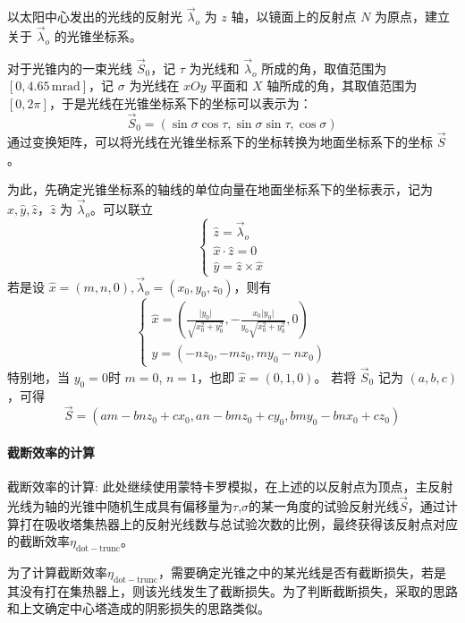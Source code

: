 \documentclass[../main.tex]{subfiles}
\begin{document}
以太阳中心发出的光线的反射光 \(\vec\lambda _{o} \) 为 \(z\) 轴，以镜面上的反射点 \(N\) 为原点，建立关于 \(\vec \lambda _{o}\) 的光锥坐标系。

对于光锥内的一束光线 \(\vec S _{0}\)，记 \(\tau\) 为光线和 \(\vec\lambda _{o}\) 所成的角，取值范围为 \([0, 4.65\, \mathrm{m}\mathrm{rad}]\)，记 \(\sigma\) 为光线在 \(xOy\) 平面和 \(X\) 轴所成的角，其取值范围为 \([0 , 2\pi]\)，于是光线在光锥坐标系下的坐标可以表示为：
\[
\vec S _{0} = (\sin \sigma \cos \tau, \sin \sigma \sin \tau, \cos \sigma)
\]
通过变换矩阵，可以将光线在光锥坐标系下的坐标转换为地面坐标系下的坐标 \(\vec S\)。

为此，先确定光锥坐标系的轴线的单位向量在地面坐标系下的坐标表示，记为 \(\hat x, \hat y, \hat z\)，\(\hat z\) 为 \(\vec \lambda _{o}\)。可以联立
\[
\begin{cases}
\hat z = \vec \lambda _{o}\\
\hat x \cdot \hat z = 0\\
\hat y = \hat z \times \hat x
\end{cases}
\]
若是设 \(\hat x = (m , n , 0), \vec \lambda _{o} = (x_0, y_0,z_0)\)，则有
\[
\begin{cases}
\displaystyle\hat x = \left(\frac{\vert y_{0} \vert}{\sqrt{x_{0}^{2}+ y _{0} ^{2}}}, {-}\frac{x_{0}\vert y_{0} \vert}{y_{0}\sqrt{x_{0}^{2}+y_{0}^{2}}}, 0\right)\\
\displaystyle \hat y = ({-} n z_{0}, - m z_{0} , my_{0} - n x_{0})
\end{cases}
\]
特别地，当 \(y_{0} = 0\)时 \(m = 0 \), \(n=1\)，也即 \(\hat x  = (0,1,0)\)。
若将 \(\vec S_{0}\) 记为 \((a,b ,c)\)，可得
\begin{equation}
\vec S = (am - b nz _{0}+ c x_{0}, an - bmz_{0} + cy_{0}, bmy_{0} - bnx _{0} + cz_{0})
\end{equation}

\paragraph{截断效率的计算}
截断效率的计算: 此处继续使用蒙特卡罗模拟，在上述的以反射点为顶点，主反射光线为轴的光锥中随机生成具有偏移量为\(\tau\),\(\sigma\)的某一角度的试验反射光线\(\vec S\)，通过计算打在吸收塔集热器上的反射光线数与总试验次数的比例，最终获得该反射点对应的截断效率\(\eta _{\mathrm{dot}{-}\mathrm{trunc}}\)。

为了计算截断效率\(\eta _{\mathrm{dot-trunc}}\)，需要确定光锥之中的某光线是否有截断损失，若是其没有打在集热器上，则该光线发生了截断损失。为了判断截断损失，采取的思路和上文确定中心塔造成的阴影损失的思路类似。
\end{document}
